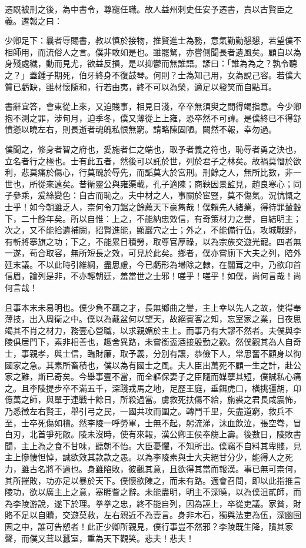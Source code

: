 \begin{pinyinscope}
遷既被刑之後，為中書令，尊寵任職。故人益州刺史任安予遷書，責以古賢臣之義。遷報之曰：

少卿足下：曩者辱賜書，教以慎於接物，推賢進士為務，意氣勤勤懇懇，若望僕不相師用，而流俗人之言。僕非敢如是也。雖罷駑，亦嘗側聞長者遺風矣。顧自以為身殘處穢，動而見尤，欲益反損，是以抑鬱而無誰語。諺曰：「誰為為之？孰令聽之？」蓋鍾子期死，伯牙終身不復鼓琴。何則？士為知己用，女為說己容。若僕大質已虧缺，雖材懷隨和，行若由夷，終不可以為榮，適足以發笑而自點耳。

書辭宜答，會東從上來，又迫賤事，相見日淺，卒卒無須臾之間得竭指意。今少卿抱不測之罪，涉旬月，迫季冬，僕又薄從上上雍，恐卒然不可諱。是僕終已不得舒憤懣以曉左右，則長逝者魂魄私恨無窮。請略陳固陋。闕然不報，幸勿過。

僕聞之，修身者智之府也，愛施者仁之端也，取予者義之符也，恥辱者勇之決也，立名者行之極也。士有此五者，然後可以託於世，列於君子之林矣。故禍莫憯於欲利，悲莫痛於傷心，行莫醜於辱先，而詬莫大於宮刑。刑餘之人，無所比數，非一世也，所從來遠矣。昔衛靈公與雍渠載，孔子適陳；商鞅因景監見，趙良寒心；同子參乘，爰絲變色：自古而恥之。夫中材之人，事關於宦豎，莫不傷氣。況忼慨之士乎！如今朝雖乏人，柰何令刀鋸之餘薦天下豪雋哉！僕賴先人緒業，得待罪輦轂下，二十餘年矣。所以自惟：上之，不能納忠效信，有奇策材力之譽，自結明主；次之，又不能拾遺補闕，招賢進能，顯巖穴之士；外之，不能備行伍，攻城戰野，有斬將搴旗之功；下之，不能累日積勞，取尊官厚祿，以為宗族交遊光寵。四者無一遂，苟合取容，無所短長之效，可見於此矣。鄉者，僕亦嘗廁下大夫之列，陪外廷末議。不以此時引維綱，盡思慮，今已虧形為埽除之隸，在闒茸之中，乃欲卬首信眉，論列是非，不亦輕朝廷，羞當世之士邪！嗟乎！嗟乎！如僕，尚何言哉！尚何言哉！

且事本末未易明也。僕少負不羈之才，長無鄉曲之譽，主上幸以先人之故，使得奉薄技，出入周衛之中。僕以為戴盆何以望天，故絕賓客之知，忘室家之業，日夜思竭其不肖之材力，務壹心營職，以求親媚於主上。而事乃有大謬不然者。夫僕與李陵俱居門下，素非相善也，趣舍異路，未嘗銜盃酒接殷勤之歡。然僕觀其為人自奇士，事親孝，與士信，臨財廉，取予義，分別有讓，恭儉下人，常思奮不顧身以徇國家之急。其素所畜積也，僕以為有國士之風。夫人臣出萬死不顧一生之計，赴公家之難，斯已奇矣。今舉事壹不當，而全軀保妻子之臣隨而媒孽其短，僕誠私心痛之。且李陵提步卒不滿五千，深踐戎馬之地，足歷王庭，垂餌虎口，橫挑彊胡，卬億萬之師，與單于連戰十餘日，所殺過當。虜救死扶傷不給，旃裘之君長咸震怖，乃悉徵左右賢王，舉引弓之民，一國共攻而圍之。轉鬥千里，矢盡道窮，救兵不至，士卒死傷如積。然李陵一呼勞軍，士無不起，躬流涕，沬血飲泣，張空弮，冒白刃，北首爭死敵。陵未沒時，使有來報，漢公卿王侯奉觴上壽。後數日，陵敗書聞，主上為之食不甘味，聽朝不怡。大臣憂懼，不知所出。僕竊不自料其卑賤，見主上慘悽怛悼，誠欲效其款款之愚。以為李陵素與士大夫絕甘分少，能得人之死力，雖古名將不過也。身雖陷敗，彼觀其意，且欲得其當而報漢。事已無可柰何，其所摧敗，功亦足以暴於天下。僕懷欲陳之，而未有路。適會召問，即以此指推言陵功，欲以廣主上之意，塞睚眥之辭。未能盡明，明主不深曉，以為僕沮貳師，而為李陵游說，遂下於理。拳拳之忠，終不能自列，因為誣上，卒從吏議。家貧，財賂不足以自贖，交遊莫救，左右親近不為壹言。身非木石，獨與法吏為伍，深幽囹圄之中，誰可告愬者！此正少卿所親見，僕行事豈不然邪？李陵既生降，隤其家聲，而僕又茸以蠶室，重為天下觀笑。悲夫！悲夫！


\end{pinyinscope}
